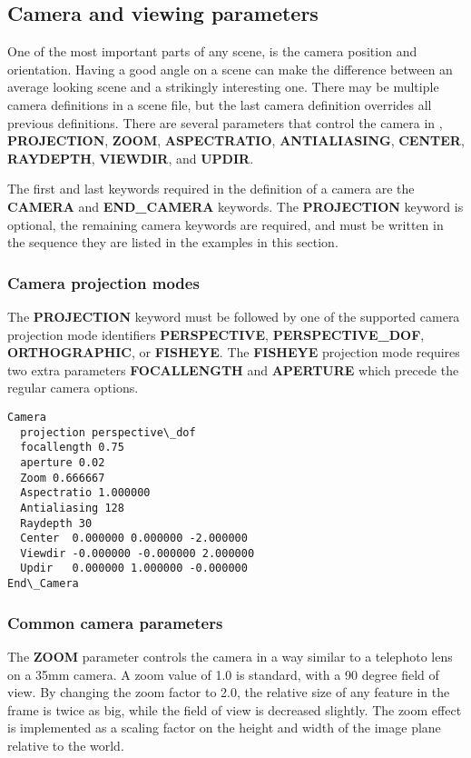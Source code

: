 \subsection{Camera and viewing parameters}
  One of the most important parts of any scene, is the camera position and
orientation.  Having a good angle on a scene can make the difference between
an average looking scene and a strikingly interesting one.  There may be
multiple camera definitions in a scene file, but the last camera definition
overrides all previous definitions.
There are several parameters that control the camera in \RAY, 
{\bf PROJECTION}, {\bf ZOOM}, {\bf ASPECTRATIO}, {\bf ANTIALIASING},
 {\bf CENTER}, {\bf RAYDEPTH}, {\bf VIEWDIR}, and {\bf UPDIR}.  

The first and last keywords required in the definition of a camera are the 
{\bf CAMERA} and {\bf END\_CAMERA} keywords.  The {\bf PROJECTION} keyword 
is optional, the remaining camera keywords are required, and must be 
written in the sequence they are listed in the examples in this section.

\subsubsection{Camera projection modes}
  The {\bf PROJECTION} keyword must be followed by one of the supported
camera projection mode identifiers {\bf PERSPECTIVE}, {\bf PERSPECTIVE\_DOF}, 
{\bf ORTHOGRAPHIC}, or {\bf FISHEYE}.  The {\bf FISHEYE} projection mode 
requires two extra parameters {\bf FOCALLENGTH} and {\bf APERTURE} 
which precede the regular camera options.

\begin{verbatim}
Camera
  projection perspective\_dof
  focallength 0.75
  aperture 0.02
  Zoom 0.666667
  Aspectratio 1.000000
  Antialiasing 128
  Raydepth 30
  Center  0.000000 0.000000 -2.000000
  Viewdir -0.000000 -0.000000 2.000000
  Updir   0.000000 1.000000 -0.000000
End\_Camera
\end{verbatim}

\subsubsection{Common camera parameters}
  The {\bf ZOOM} parameter controls the camera in a way similar to a 
telephoto lens on a 35mm camera.  A zoom value of 1.0 is standard, 
with a 90 degree field of view.  By changing the zoom factor to 2.0, 
the relative size of any feature in the frame is twice as big, while 
the field of view is decreased slightly.  The zoom effect is 
implemented as a scaling factor on the height and width of the image 
plane relative to the world.

